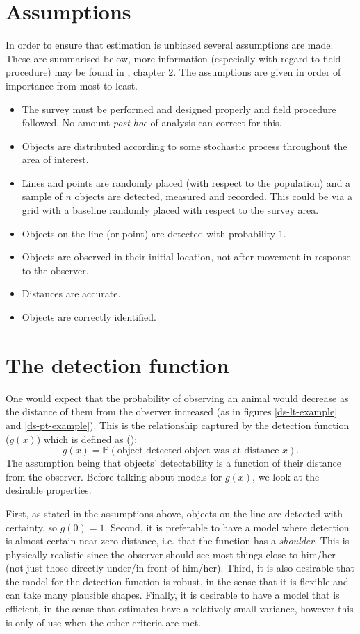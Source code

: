 \section{Assumptions}
In order to ensure that estimation is unbiased several assumptions are made. These are summarised below, more information (especially with regard to field procedure) may be found in , chapter 2. The assumptions are given in order of importance from most to least.
\begin{itemize}
	\item The survey must be performed and designed properly and field procedure followed. No amount \textit{post hoc} of analysis can correct for this.
	\item Objects are distributed according to some stochastic process throughout the area of interest.
	\item Lines and points are randomly placed (with respect to the population) and a sample of $n$ objects are detected, measured and recorded. This could be via a grid with a baseline randomly placed with respect to the survey area.
	\item Objects on the line (or point) are detected with probability 1.
	\item Objects are observed in their initial location, not after movement in response to the observer.
	\item Distances are accurate.
	\item Objects are correctly identified.
\end{itemize}

\section{The detection function}
\label{intro-ds-detefct}

One would expect that the probability of observing an animal would decrease as the distance of them from the observer increased (as in figures \ref{ds-lt-example} and \ref{ds-pt-example}). This is the relationship captured by the detection function ($g(x)$) which is defined as (\cite[p. 10]{IDS}):
\begin{equation*}
g(x)=\mathbb{P} (\text{object detected} | \text{object was at distance } x).
\end{equation*}
The assumption being that objects' detectability is a function of their distance from the observer. Before talking about models for $g(x)$, we look at the desirable properties.

First, as stated in the assumptions above, objects on the line are detected with certainty, so $g(0)=1$. Second, it is preferable to have a model where detection is almost certain near zero distance, i.e. that the function has a \textit{shoulder}. This is physically realistic since the observer should see most things close to him/her (not just those directly under/in front of him/her). Third, it is also desirable that the model for the detection function is robust, in the sense that it is flexible and can take many plausible shapes. Finally, it is desirable to have a model that is efficient, in the sense that estimates have a relatively small variance, however this is only of use when the other criteria are met.

